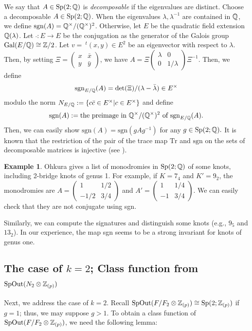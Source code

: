 \documentclass{article}
\theoremstyle{plain}
\theoremstyle{definition}
\newtheorem{exa}[thm]{Example}
\newcommand{\ra}{\rightarrow}
\newcommand{\Q}{{\Bbb Q}}
\newcommand{\Z}{{\Bbb Z}}
\newcommand{\Sp}{{\rm Sp}}
\newcommand{\SpOut}{{\rm SpOut}}
\begin{document}
{We say that $A \in \Sp(2; \Q) $ is {\it decomposable} if the eigenvalues are distinct. Choose a decomposable $ A \in \Sp(2; \Q) $. When the eigenvalues $\lambda, \lambda^{-1} $ are contained in $\Q$, we define $ \mathrm{sgn}(A)= \Q^{\times }/ (\Q^{\times } )^2 $. Otherwise, let $E$ be the quadratic field extension $\Q( \lambda)$. Let $\bar{ }: E \ra E$ be the conjugation as the generator of the Galois group $\mathrm{Gal}(E/\Q) \cong \Z/2$. Let $v= \ ^t (x,y) \in E^2$ be an eigenvector with respect to $\lambda$. Then, by setting $\Xi = \left(\begin{smallmatrix}x & \bar{x} \\ y & \bar{y}\end{smallmatrix}\right) $, we have $ A = \Xi \left(\begin{smallmatrix}\lambda & 0 \\ 0 & 1/ \lambda\end{smallmatrix}\right) \Xi^{-1} $. Then, we define
\[ \mathrm{sgn}_{E/ \Q}(A) =\mathrm{det} (\Xi )/ (\lambda -\bar{\lambda}) \in E^{\times} \]
modulo the norm $N_{E/\Q}:= \{ c \bar{c}\in  E^{\times}  | c \in  E^{\times} \} $ and define
\[\mathrm{sgn}(A) := \text{the preimage in } \Q^{\times}/(\Q^{\times})^ 2 \text{ of }\mathrm{sgn}_{E/ \Q}(A). \]
Then, we can easily show $\mathrm{sgn}(A) = \mathrm{sgn}(gAg^{-1}) $ for any $g \in \Sp(2; \Q).$ It is known that the restriction of the pair of the trace map $\mathrm{Tr}$ and $\mathrm{sgn} $ on the sets of decomposable matrices is injective (see \cite[Page 8]{Ca}).
\begin{exa}
Ohkura \cite{Oh} gives a list of monodromies in $\Sp(2; \Q)$ of some knots, including 2-bridge knots of genus 1. For example, if $K=7_4$ and $K'=9_2$, the monodromies are $A= \left(\begin{smallmatrix}1 & 1/2 \\-1/2 & 3/4\end{smallmatrix}\right)$ and $A'= \left(\begin{smallmatrix}1 & 1/4 \\-1 & 3/4\end{smallmatrix}\right) $. We can easily check that they are not conjugate using sgn.
\end{exa}
Similarly, we can compute the signatures and distinguish some knots (e.g., $9_5$ and $13_2$). In our experience, the map sgn seems to be a strong invariant for knots of genus one.

\subsection{The case of $k=2$; Class function from $\SpOut( N_2 \otimes \Z_{(p)})$}
\label{ooi23}
Next, we address the case of $k=2$. Recall $ \SpOut(F/F_2 \otimes \Z_{(p)}) \cong \Sp(2; \Z_{(p)})$ if $g=1$; thus, we may suppose $g>1$. To obtain a class function of $ \SpOut(F/F_2 \otimes \Z_{(p)})$, we need the following lemma:

}
\end{document}
